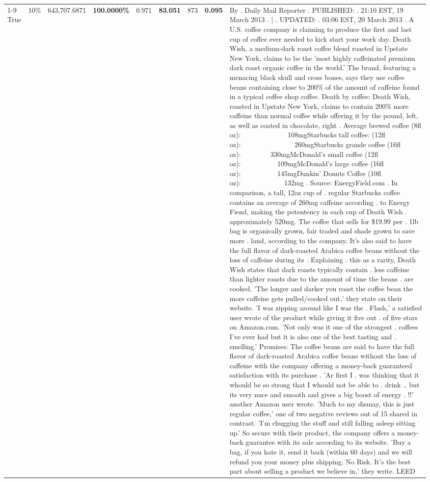 \begin{table}[H]
{\begin{tabular}{lllrlllll}
\cline{1-9} \cline{2-9}
True & 10\% & 643,707.6871 & \bfseries \color{red} 100.0000\% & 0.971 & \bfseries \color{red} 83.051 & 873 & \bfseries \color{red} 0.095 & By . Daily Mail Reporter . PUBLISHED: . 21:10 EST, 19 March 2013 . | . UPDATED: . 03:06 EST, 20 March 2013 . A U.S. coffee company is claiming to produce the first and last cup of coffee ever needed to kick start your work day. Death Wish, a medium-dark roast coffee blend roasted in Upstate New York, claims to be the 'most highly caffeinated premium dark roast organic coffee in the world.' The brand, featuring a menacing black skull and cross bones, says they use coffee beans containing close to 200\% of the amount of caffeine found in a typical coffee shop coffee. Death by coffee: Death Wish, roasted in Upstate New York, claims to contain 200\% more caffeine than normal coffee while offering it by the pound, left, as well as coated in chocolate, right . Average brewed coffee (8fl oz):              108mgStarbucks tall coffee: (12fl oz):                260mgStarbucks grande coffee (16fl oz):         330mgMcDonald's small coffee (12fl oz):           109mgMcDonald's large coffee (16fl oz):           145mgDunkin' Donuts Coffee (10fl oz):             132mg . Source: EnergyField.com . In comparison, a tall, 12oz cup of . regular Starbucks coffee contains an average of 260mg caffeine according . to Energy Fiend, making the potentency in each cup of Death Wish . approximately 520mg. The coffee that sells for \$19.99 per . 1lb bag is organically grown, fair traded and shade grown to save more . land, according to the company. It's also said to have the full flavor of dark-roasted Arabica coffee beans without the loss of caffeine during its . Explaining . this as a rarity, Death Wish states that dark roasts typically contain . less caffeine than lighter roasts due to the amount of time the beans . are cooked. 'The longer and darker you roast the coffee bean the more caffeine gets pulled/cooked out,' they state on their website. 'I was zipping around like I was the . Flash,' a satisfied user wrote of the product while giving it five out . of five stars on Amazon.com. 'Not only was it one of the strongest . coffees I've ever had but it is also one of the best tasting and . smelling.’ Promises: The coffee beans are said to have the full flavor of dark-roasted Arabica coffee beans without the loss of caffeine with the company offering a money-back guaranteed satisfaction with its purchase . 'Ar first I . was thinking that it whould be so strong that I whould not be able to . drink .. but its very nuce and smooth and gives a big boost of energy . !!' another Amazon user wrote. 'Much to my dismay, this is just regular coffee,' one of two negative reviews out of 15 shared in contrast. 'I'm chugging the stuff and still falling asleep sitting up.' So secure with their product, the company offers a money-back guarantee with its sale according to its website. 'Buy a bag, if you hate it, send it back (within 60 days) and we will refund you your money plus shipping. No Risk. It’s the best part about selling a product we believe in,' they write. LEED \\

\end{tabular}}
\end{table}
